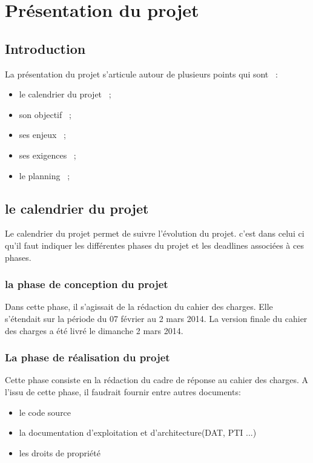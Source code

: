 \chapter{Présentation du projet}

% 

\section{Introduction}
La présentation du projet s'articule autour de plusieurs points qui sont ~: 
\begin{itemize}
   \item le calendrier du projet ~;
   \item son objectif ~;
   \item ses enjeux ~;
   \item ses exigences ~;
   \item le planning ~;
\end{itemize}

\section{le calendrier du projet}
Le calendrier du projet permet de suivre l'évolution du projet. c'est dans celui ci qu'il faut indiquer les différentes phases du projet et les deadlines associées à ces phases.

\subsection{la phase de conception du projet}
Dans cette phase, il s'agissait de la rédaction du cahier des charges. Elle s'étendait sur la période du 07 février au 2 mars 2014. La version finale du cahier des charges a été livré le dimanche 2 mars 2014. 

\subsection{La phase de réalisation du projet}
Cette phase consiste en la rédaction du cadre de réponse au cahier des charges. A l'issu de cette phase, il faudrait fournir entre autres documents:
  \begin{itemize}
    \item le code source
    \item la documentation d'exploitation et d'architecture(DAT, PTI ...)
    \item les droits de propriété
  \end{itemize}

